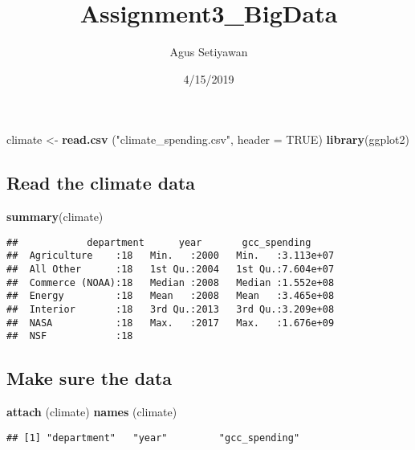 \documentclass[]{article}
\title{Assignment3\_BigData}
\author{Agus Setiyawan}
\date{4/15/2019}
\newenvironment{Shaded}{\begin{snugshade}}{\end{snugshade}}
\newcommand{\KeywordTok}[1]{\textcolor[rgb]{0.13,0.29,0.53}{\textbf{#1}}}
\newcommand{\DataTypeTok}[1]{\textcolor[rgb]{0.13,0.29,0.53}{#1}}
\newcommand{\StringTok}[1]{\textcolor[rgb]{0.31,0.60,0.02}{#1}}
\newcommand{\OtherTok}[1]{\textcolor[rgb]{0.56,0.35,0.01}{#1}}
\newcommand{\NormalTok}[1]{#1}
\begin{document}
\maketitle

\begin{Shaded}
\begin{Highlighting}[]
\NormalTok{climate <-}\StringTok{ }\KeywordTok{read.csv}\NormalTok{ (}\StringTok{"climate_spending.csv"}\NormalTok{, }\DataTypeTok{header =} \OtherTok{TRUE}\NormalTok{)}
\KeywordTok{library}\NormalTok{(ggplot2)}
\end{Highlighting}
\end{Shaded}

\subsection{Read the climate data}\label{read-the-climate-data}

\begin{Shaded}
\begin{Highlighting}[]
\KeywordTok{summary}\NormalTok{(climate)}
\end{Highlighting}
\end{Shaded}

\begin{verbatim}
##            department      year       gcc_spending      
##  Agriculture    :18   Min.   :2000   Min.   :3.113e+07  
##  All Other      :18   1st Qu.:2004   1st Qu.:7.604e+07  
##  Commerce (NOAA):18   Median :2008   Median :1.552e+08  
##  Energy         :18   Mean   :2008   Mean   :3.465e+08  
##  Interior       :18   3rd Qu.:2013   3rd Qu.:3.209e+08  
##  NASA           :18   Max.   :2017   Max.   :1.676e+09  
##  NSF            :18
\end{verbatim}

\subsection{Make sure the data}\label{make-sure-the-data}

\begin{Shaded}
\begin{Highlighting}[]
\KeywordTok{attach}\NormalTok{ (climate)}
\KeywordTok{names}\NormalTok{ (climate)}
\end{Highlighting}
\end{Shaded}

\begin{verbatim}
## [1] "department"   "year"         "gcc_spending"
\end{verbatim}
\end{document}
